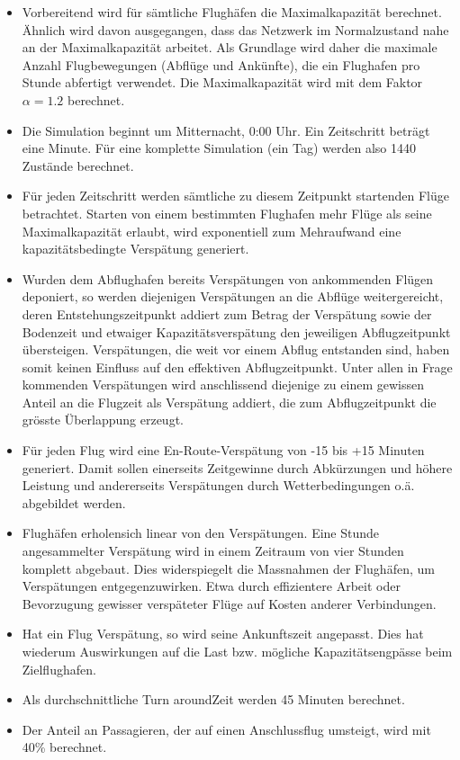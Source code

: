 \begin{itemize}
    \item Vorbereitend wird für sämtliche Flughäfen die Maximalkapazität berechnet. Ähnlich \cite{anh-tran-worldwide-aviation-network} wird davon ausgegangen, dass das Netzwerk im Normalzustand nahe an der Maximalkapazität arbeitet. Als Grundlage wird daher die maximale Anzahl Flugbewegungen (Abflüge und Ankünfte), die ein Flughafen pro Stunde abfertigt verwendet. Die Maximalkapazität wird mit dem Faktor $\alpha = 1.2$ berechnet.
    \item Die Simulation beginnt um Mitternacht, 0:00 Uhr. Ein Zeitschritt beträgt eine Minute. Für eine komplette Simulation (ein Tag) werden also 1440 Zustände berechnet.
    \item Für jeden Zeitschritt werden sämtliche zu diesem Zeitpunkt startenden Flüge betrachtet. Starten von einem bestimmten Flughafen mehr Flüge als seine Maximalkapazität erlaubt, wird exponentiell zum Mehraufwand eine kapazitätsbedingte Verspätung generiert.
    \item Wurden dem Abflughafen bereits Verspätungen von ankommenden Flügen deponiert, so werden diejenigen Verspätungen an die Abflüge weitergereicht, deren Entstehungszeitpunkt addiert zum Betrag der Verspätung sowie der Bodenzeit und etwaiger Kapazitätsverspätung den jeweiligen Abflugzeitpunkt übersteigen. Verspätungen, die weit vor einem Abflug entstanden sind, haben somit keinen Einfluss auf den effektiven Abflugzeitpunkt. Unter allen in Frage kommenden Verspätungen wird anschlissend diejenige zu einem gewissen Anteil an die Flugzeit als Verspätung addiert, die zum Abflugzeitpunkt die grösste Überlappung erzeugt.
    \item Für jeden Flug wird eine En-Route-Verspätung von -15 bis +15 Minuten generiert. Damit sollen einerseits Zeitgewinne durch Abkürzungen und höhere Leistung und andererseits Verspätungen durch Wetterbedingungen o.ä. abgebildet werden.
    \item Flughäfen \guillemotleft erholen\guillemotright sich linear von den Verspätungen. Eine Stunde angesammelter Verspätung wird in einem Zeitraum von vier Stunden komplett abgebaut. Dies widerspiegelt die Massnahmen der Flughäfen, um Verspätungen entgegenzuwirken. Etwa durch effizientere Arbeit oder Bevorzugung gewisser verspäteter Flüge auf Kosten anderer Verbindungen.
    \item Hat ein Flug Verspätung, so wird seine Ankunftszeit angepasst. Dies hat wiederum Auswirkungen auf die Last bzw. mögliche Kapazitätsengpässe beim Zielflughafen.
    \item Als durchschnittliche \guillemotleft Turn around\guillemotright Zeit werden 45 Minuten berechnet.
    \item Der Anteil an Passagieren, der auf einen Anschlussflug umsteigt, wird mit 40\% berechnet.
\end{itemize}

